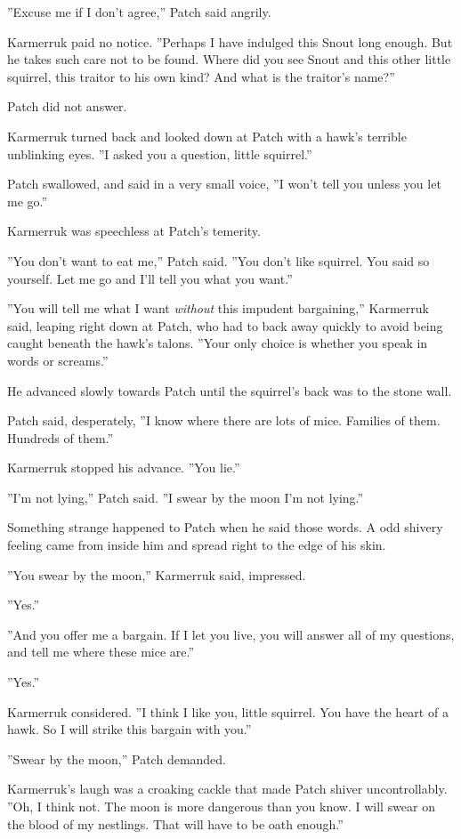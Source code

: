 \documentclass[12pt]{book}
\begin{document}
''Excuse me if I don't agree,'' Patch said angrily.

Karmerruk paid no notice. ''Perhaps I have indulged this Snout long enough. But he takes such care not to be found. Where did you see Snout and this other little squirrel, this traitor to his own kind? And what is the traitor's name?''

Patch did not answer.

Karmerruk turned back and looked down at Patch with a hawk's terrible unblinking eyes. ''I asked you a question, little squirrel.''

Patch swallowed, and said in a very small voice, ''I won't tell you unless you let me go.''

Karmerruk was speechless at Patch's temerity.

''You don't want to eat me,'' Patch said. ''You don't like squirrel. You said so yourself. Let me go and I'll tell you what you want.''

''You will tell me what I want {\it without} this impudent bargaining,'' Karmerruk said, leaping right down at Patch, who had to back away quickly to avoid being caught beneath the hawk's talons. ''Your only choice is whether you speak in words or screams.''

He advanced slowly towards Patch until the squirrel's back was to the stone wall.

Patch said, desperately, ''I know where there are lots of mice. Families of them. Hundreds of them.''

Karmerruk stopped his advance. ''You lie.''

''I'm not lying,'' Patch said. ''I swear by the moon I'm not lying.''

Something strange happened to Patch when he said those words. A odd shivery feeling came from inside him and spread right to the edge of his skin.

''You swear by the moon,'' Karmerruk said, impressed.

''Yes.''

''And you offer me a bargain. If I let you live, you will answer all of my questions, and tell me where these mice are.''

''Yes.''

Karmerruk considered. ''I think I like you, little squirrel. You have the heart of a hawk. So I will strike this bargain with you.''

''Swear by the moon,'' Patch demanded.

Karmerruk's laugh was a croaking cackle that made Patch shiver uncontrollably. ''Oh, I think not. The moon is more dangerous than you know. I will swear on the blood of my nestlings. That will have to be oath enough.''
\end{document}
